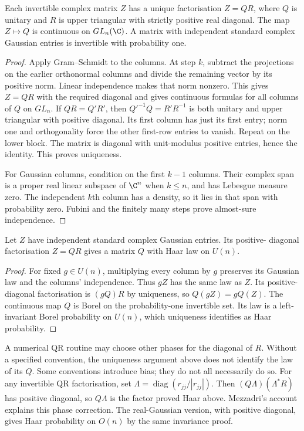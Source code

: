 \begin{lemma}\label{lem:qr}
Each invertible complex matrix $Z$ has a unique factorisation $Z=QR$,
where $Q$ is unitary and $R$ is upper triangular with strictly positive
real diagonal. The map $Z\mapsto Q$ is continuous on $GL_n(\C)$.
A matrix with independent standard complex Gaussian entries is invertible
with probability one.
\end{lemma}
\begin{proof}
Apply Gram--Schmidt to the columns. At step $k$, subtract the projections
on the earlier orthonormal columns and divide the remaining vector by its
positive norm. Linear independence makes that norm nonzero.
This gives $Z=QR$ with the required diagonal and gives continuous formulas
for all columns of $Q$ on $GL_n$.
If $QR=Q'R'$, then $Q'^{-1}Q=R'R^{-1}$ is both unitary and upper
triangular with positive diagonal. Its first column has just its first
entry; norm one and orthogonality force the other first-row entries to
vanish. Repeat on the lower block. The matrix is diagonal with unit-modulus
positive entries, hence the identity. This proves uniqueness.

For Gaussian columns, condition on the first $k-1$ columns.
Their complex span is a proper real linear subspace of $\C^n$ when
$k\le n$, and has Lebesgue measure zero. The independent $k$th column
has a density, so it lies in that span with probability zero.
Fubini and the finitely many steps prove almost-sure independence.
\end{proof}

\begin{theorem}\label{thm:qrhaar}
Let $Z$ have independent standard complex Gaussian entries. Its positive-
diagonal factorisation $Z=QR$ gives a matrix $Q$ with Haar law on $U(n)$.
\end{theorem}
\begin{proof}
For fixed $g\in U(n)$, multiplying every column by $g$ preserves its
Gaussian law and the columns' independence. Thus $gZ$ has the same law
as $Z$. Its positive-diagonal factorisation is $(gQ)R$ by uniqueness,
so $Q(gZ)=gQ(Z)$. The continuous map $Q$ is Borel on the probability-one
invertible set. Its law is a left-invariant Borel probability on $U(n)$,
which uniqueness identifies as Haar probability.
\end{proof}

\begin{remark}
A numerical QR routine may choose other phases for the diagonal of $R$.
Without a specified convention, the uniqueness argument above does not
identify the law of its $Q$. Some conventions introduce bias; they do not
all necessarily do so. For any invertible QR factorisation, set
$\Lambda=\operatorname{diag}(r_{jj}/|r_{jj}|)$.
Then $(Q\Lambda)(\Lambda^*R)$ has positive diagonal, so $Q\Lambda$
is the factor proved Haar above. Mezzadri's account explains this phase
correction. The real-Gaussian version, with positive diagonal, gives Haar
probability on $O(n)$ by the same invariance proof.
\end{remark}

